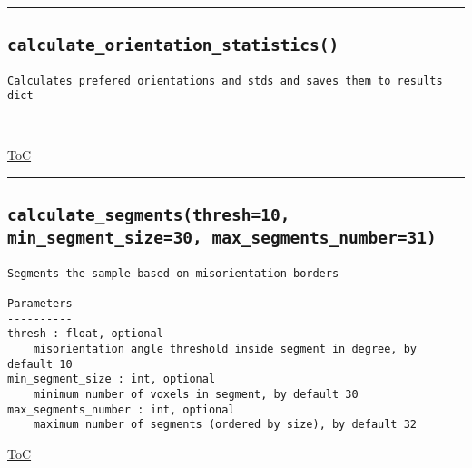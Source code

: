 \documentclass{article}
\begin{document}


\vspace{5mm}

\hrule

\subsection*{\texttt{calculate\_orientation\_statistics()}}
\label{fun:calculateorientationstatistics}

\begin{lstlisting}[language=docstring]
Calculates prefered orientations and stds and saves them to results dict

    
\end{lstlisting}

\begin{flushright}

\hyperref[toc]{ToC}

\end{flushright}



\vspace{5mm}

\hrule

\subsection*{\texttt{calculate\_segments(thresh=10, min\_segment\_size=30, max\_segments\_number=31)}}
\label{fun:calculatesegments}

\begin{lstlisting}[language=docstring]
Segments the sample based on misorientation borders

Parameters
----------
thresh : float, optional
    misorientation angle threshold inside segment in degree, by default 10
min_segment_size : int, optional
    minimum number of voxels in segment, by default 30
max_segments_number : int, optional
    maximum number of segments (ordered by size), by default 32
\end{lstlisting}

\begin{flushright}

\hyperref[toc]{ToC}

\end{flushright}
\end{document}

